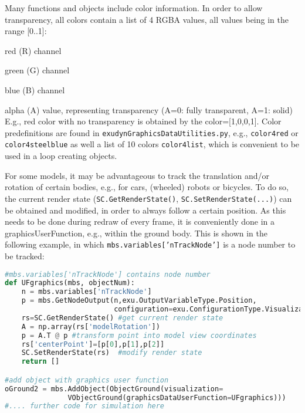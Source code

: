 Many functions and objects include color information. In order to allow transparency, all colors contain a list of 4 RGBA values, all values being in the range [0..1]:
\bi
  \item red (R) channel 
	\item green (G) channel  
	\item blue (B) channel 
	\item alpha (A) value, representing transparency (A=0: fully transparent, A=1: solid)
\ei
E.g., red color with no transparency is obtained by the color=[1,0,0,1]. Color predefinitions are found in \texttt{exudynGraphicsDataUtilities.py}, e.g., \texttt{color4red} or \texttt{color4steelblue} as well a list of 10 colors \texttt{color4list}, which is convenient to be used in a loop creating objects.

\label{secInteractModelView}
For some models, it may be advantageous to track the translation and/or rotation of certain bodies, e.g., for cars, (wheeled) robots or bicycles. 
To do so, the current render state (\texttt{SC.GetRenderState()}, \texttt{SC.SetRenderState(...)}) can be obtained and modified, in order to always follow a certain position.
As this needs to be done during redraw of every frame, it is conveniently done in a graphicsUserFunction, e.g., within the ground body. This is shown in the following example, in which \texttt{mbs.variables['nTrackNode']} is a node number to be tracked:
%
\pythonstyle
\begin{lstlisting}[language=Python, firstnumber=1]
#mbs.variables['nTrackNode'] contains node number
def UFgraphics(mbs, objectNum):
    n = mbs.variables['nTrackNode']
    p = mbs.GetNodeOutput(n,exu.OutputVariableType.Position, 
                          configuration=exu.ConfigurationType.Visualization)
    rs=SC.GetRenderState() #get current render state
    A = np.array(rs['modelRotation'])
    p = A.T @ p #transform point into model view coordinates
    rs['centerPoint']=[p[0],p[1],p[2]]
    SC.SetRenderState(rs)  #modify render state
    return []

#add object with graphics user function
oGround2 = mbs.AddObject(ObjectGround(visualization=
               VObjectGround(graphicsDataUserFunction=UFgraphics)))
#.... further code for simulation here
\end{lstlisting}


